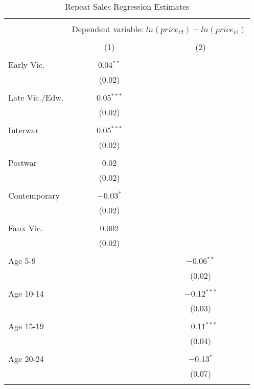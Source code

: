 
\begin{table}[!htb] \centering 
  \caption{Repeat Sales Regression Estimates} 
  \label{tab:repreg} 
\footnotesize 
\begin{tabular}{@{\extracolsep{5pt}}lcc} 
\\[-1.8ex]\hline 
\hline \\[-1.8ex] 
 & \multicolumn{2}{c}{Dependent variable: $ln(price_{t2}) - ln(price_{t1})$} \\ 
\cline{2-3} 
\\[-1.8ex] & (1) & (2)\\ 
\hline \\[-1.8ex] 
 Early Vic. & 0.04$^{**}$ &  \\ 
  & (0.02) &  \\ 
  & & \\ 
 Late Vic./Edw. & 0.05$^{***}$ &  \\ 
  & (0.02) &  \\ 
  & & \\ 
 Interwar & 0.05$^{***}$ &  \\ 
  & (0.02) &  \\ 
  & & \\ 
 Postwar & 0.02 &  \\ 
  & (0.02) &  \\ 
  & & \\ 
 Contemporary & $-$0.03$^{*}$ &  \\ 
  & (0.02) &  \\ 
  & & \\ 
 Faux Vic. & 0.002 &  \\ 
  & (0.02) &  \\ 
  & & \\ 
 Age 5-9 &  & $-$0.06$^{**}$ \\ 
  &  & (0.02) \\ 
  & & \\ 
 Age 10-14 &  & $-$0.12$^{***}$ \\ 
  &  & (0.03) \\ 
  & & \\ 
 Age 15-19 &  & $-$0.11$^{***}$ \\ 
  &  & (0.04) \\ 
  & & \\ 
 Age 20-24 &  & $-$0.13$^{*}$ \\ 
  &  & (0.07) \\ 
  & & \\ 

\end{tabular}
\end{table}
